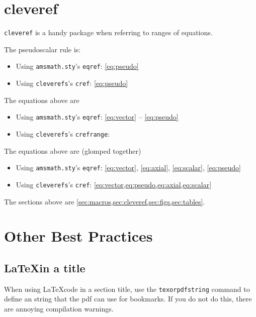 \section{cleveref}
\label{sec:cleveref}

\texttt{cleveref} is a handy package when referring to ranges of equations. 

The pseudoscalar rule is:
\begin{itemize}
	\item Using \texttt{amsmath.sty}'s \texttt{eqref}: \eqref{eq:pseudo}
	\item Using \texttt{cleverefs}'s \texttt{cref}: \cref{eq:pseudo}
\end{itemize}

The equations above are
\begin{itemize}
	\item Using \texttt{amsmath.sty}'s \texttt{eqref}: \eqref{eq:vector} -- \eqref{eq:pseudo}
	\item Using \texttt{cleverefs}'s \texttt{crefrange}: 
\end{itemize}

The equations above are (glomped together)
\begin{itemize}
	\item Using \texttt{amsmath.sty}'s \texttt{eqref}: \eqref{eq:vector}, \eqref{eq:axial}, \eqref{eq:scalar}, \eqref{eq:pseudo}
	\item Using \texttt{cleverefs}'s \texttt{cref}: \cref{eq:vector,eq:pseudo,eq:axial,eq:scalar}
\end{itemize}

The sections above are \cref{sec:macros,sec:cleveref,sec:figs,sec:tables}.

\section{Other Best Practices}


\subsection{\texorpdfstring{\LaTeX in a title}{LaTeX in a title}}

When using \LaTeX code in a section title, use the \texttt{texorpdfstring} command to define an  string that the pdf can use for bookmarks. If you do not do this, there are annoying compilation warnings.

